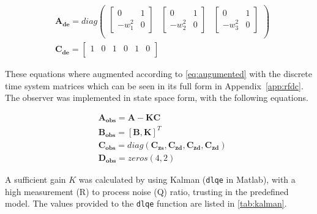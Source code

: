 \begin{subequations}
  \label{eq:augmentedres}
  \begin{alignat}{2}
    & \mathbf{A_{de}} = diag
    \begin{pmatrix}
      \begin{bmatrix}
         0 & 1\\[0.3em]
         -w_1^2 & 0
       \end{bmatrix}  &
       \begin{bmatrix}
          0 & 1\\[0.3em]
          -w_2^2 & 0
        \end{bmatrix} &
        \begin{bmatrix}
          0 & 1\\[0.3em]
          -w_3^2 & 0
        \end{bmatrix} \\
      \end{pmatrix} \\
    & \mathbf{C_{de}} =
        \begin{bmatrix}
            1 & 0 & 1 & 0 & 1 & 0 \\
        \end{bmatrix}
  \end{alignat}
\end{subequations}

These equations where augmented according to \eqref{eq:augumented} with the discrete time system matrices which can be seen in its full form in Appendix~\ref{app:rfdc}. The observer was implemented in state space form, with the following equations.

\begin{subequations}
\label{eq:augmented}
  \begin{alignat}{2}
    & \mathbf{A_{obs}} = \mathbf{A - KC} \\
    & \mathbf{B_{obs}} = \mathbf{[B, K]}^T \\
    & \mathbf{C_{obs}} = diag(\mathbf{C_{zs}, C_{zd}, C_{zd}, C_{zd}}) \\
    & \mathbf{D_{obs}} = zeros(4,2)
  \end{alignat}
\end{subequations}


A sufficient gain $K$ was calculated by using Kalman (\texttt{dlqe} in Matlab), with a high measurement (R) to process noise (Q) ratio, trusting in the predefined model. The values provided to the \texttt{dlqe} function are listed in \ref{tab:kalman}.


